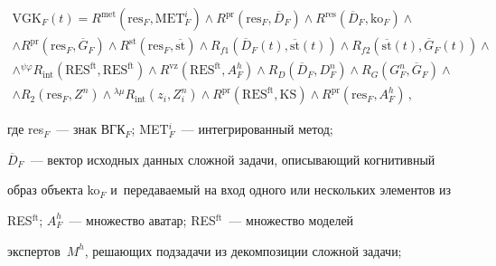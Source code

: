   \begin{multline}


  \mathrm{VGK}_F(t)= R^{\mathrm{met}}\left(\mathrm{res}_F,\mathrm{MET}_F^i\right) \wedge


  R^{\mathrm{pr}}\left(\mathrm{res}_F,\overline{D}_F\right)\wedge  R^{\mathrm{res}}\left( 


\overline{D}_F, \mathrm{ko}_F\right) \wedge\\


\wedge R^{\mathrm{pr}}\left( 


\mathrm{res}_F, \overline{G}_F\right) 


\wedge R^{\mathrm{st}} \left( \mathrm{res}_F, \overline{\mathrm{st}}\right)\wedge 


R_{f1}\left( \overline{D}_F(t),\overline{\mathrm{st}}(t)\right) \wedge R_{f2} \left( 


\overline{\mathrm{st}}(t),\overline{G}_F(t)\right) \wedge\\


\wedge {}^{\psi\varphi}R_{\mathrm{int}}\left( 


\mathrm{RES}^{\mathrm{ft}},\mathrm{RES}^{\mathrm{ft}}\right) \wedge R^{\mathrm{vz}}


\left( \mathrm{RES}^{\mathrm{ft}}, 


A_F^h\right) \wedge R_D\left( \overline{D}_F, D_F^n\right) \wedge


 R_G\left( G_F^n, \overline{G}_F\right) \wedge\\


\wedge R_2\left( \mathrm{res}_F, Z^n\right) \wedge 


{}^{\lambda\mu}R_{\mathrm{int}}\left( z_i, 


Z_i^n\right)\wedge R^{\mathrm{pr}}\left( \mathrm{RES}^{\mathrm{ft}}, \mathrm{KS}\right) \wedge 


R^{\mathrm{pr}} \left( \mathrm{res}_F, A^h_F\right)\,,


  \end{multline}


  где res$_F$~--- знак ВГК$_F$; MET$_F^i$~--- интегрированный метод;  


$\overline{D}_F$~--- вектор исходных данных сложной задачи, описывающий когнитивный 


образ объекта ko$_F$ и~передаваемый на вход одного или нескольких элементов из 


RES$^{\mathrm{ft}}$; $A_F^h$~--- множество аватар; RES$^{\mathrm{ft}}$~--- множество моделей 


экспертов~$M^h$, решающих подзадачи из декомпозиции сложной задачи;  


